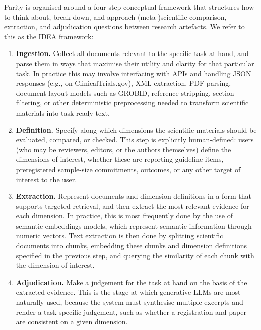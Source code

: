 \documentclass{article}
\begin{document}
Parity is organised around a four-step conceptual framework that structures how
to think about, break down, and approach (meta-)scientific comparison,
extraction, and adjudication questions between research artefacts. We refer to
this as the IDEA framework:
\begin{enumerate}
  \item \textbf{Ingestion.} Collect all documents relevant to the specific task
  at hand, and parse them in ways that maximise their utility and clarity for
  that particular task. In practice this may involve interfacing with APIs and
  handling JSON responses (e.g., on ClinicalTrials.gov), XML extraction, PDF
  parsing, document-layout models such as GROBID, reference stripping, section
  filtering, or other deterministic preprocessing needed to transform scientific
  materials into task-ready text.
  \item \textbf{Definition.} Specify along which dimensions the scientific
  materials should be evaluated, compared, or checked. This step is explicitly
  human-defined: users (who may be reviewers, editors, or the authors
  themselves) define the dimensions of interest, whether these are
  reporting-guideline items, preregistered sample-size commitments, outcomes, or
  any other target of interest to the user.
  \item \textbf{Extraction.} Represent documents and dimension definitions in a
  form that supports targeted retrieval, and then extract the most relevant
  evidence for each dimension. In practice, this is most frequently done by the
  use of semantic embeddings models, which represent semantic information
  through numeric vectors. Text extraction is then done by splitting scientific
  documents into chunks, embedding these chunks and dimension definitions
  specified in the previous step, and querying the similarity of each chunk with
  the dimension of interest.
  \item \textbf{Adjudication.} Make a judgement for the task at hand on the
  basis of the extracted evidence. This is the stage at which generative LLMs
  are most naturally used, because the system must synthesise multiple excerpts
  and render a task-specific judgement, such as whether a registration and paper
  are consistent on a given dimension.
\end{enumerate}
\end{document}
